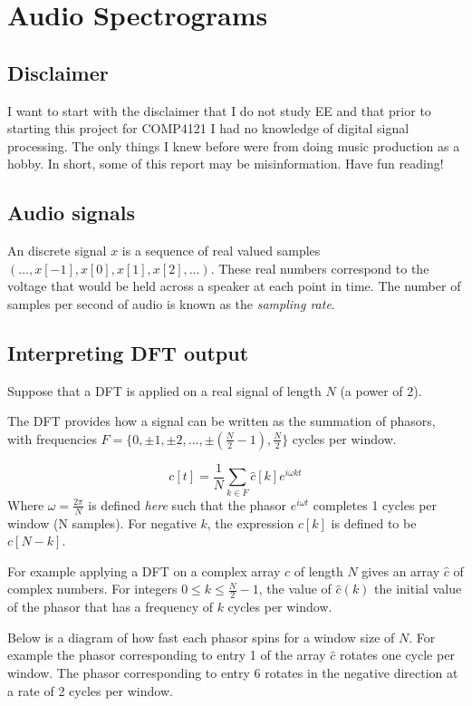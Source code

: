 \section{Audio Spectrograms}
\subsection{Disclaimer}
I want to start with the disclaimer that I do not study EE and that
prior to starting this project for COMP4121 I had no knowledge of digital signal processing.
The only things I knew before were from doing music production as a hobby.
In short, some of this report may be misinformation. Have fun reading!

\subsection{Audio signals}
An discrete signal $x$ is a sequence of real valued samples $(\dots, x[-1], x[0], x[1], x[2], \dots)$.
These real numbers correspond to the voltage that would be held across a speaker at each point in time.
The number of samples per second of audio is known as the \emph{sampling rate}.
\begin{center}\end{center}

\subsection{Interpreting DFT output}
Suppose that a DFT is applied on a real signal of length $N$ (a power of 2).

The DFT provides how a signal can be written as the summation of phasors,\\
with frequencies $F=\{0, \pm 1, \pm 2, \dots, \pm (\frac{N}{2}-1), \frac{N}{2}\}$ cycles per window.

$$c[t]=\frac{1}{N}\sum_{k\in F}\hat{c}[k]e^{i\omega k t}$$
Where $\omega=\frac{2\pi}{N}$ is defined \emph{here} such that the phasor $e^{i\omega t}$ completes 1 cycles
per window (N samples). For negative $k$, the expression
$c[k]$ is defined to be $c[N-k]$.

For example applying a DFT on a complex array $c$ of length $N$ gives an array $\hat{c}$
of complex numbers. 
For integers $0\leq k \leq \frac{N}{2}-1$,
the value of $\hat{c}(k)$ the initial value of the phasor that has a frequency of $k$ cycles per window.

Below is a diagram of how fast each phasor spins for a window size of $N$.
For example the phasor corresponding to entry 1 of the array $\hat{c}$ rotates
one cycle per window. The phasor corresponding to entry 6 rotates in the negative direction
at a rate of 2 cycles per window.
\begin{center}\end{center}


